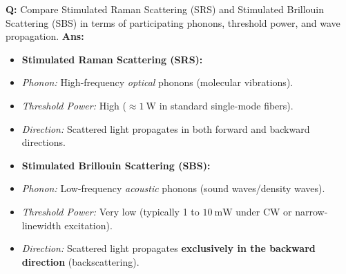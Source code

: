 \documentclass[10pt,a4paper,twocolumn]{article}
\begin{document}
\begin{tcolorbox}[
  colback=white,
  colframe=UnitColorSix,
  colbacktitle=gray!10!white,
  coltitle=black,
  fonttitle=\bfseries\sffamily\small,
  title={Unit VI $\bullet$ Card 6: SRS vs. SBS},
  boxrule=1.2pt,
  arc=2mm,
  outer arc=2mm,
  boxsep=1.5mm,
  top=1mm,
  bottom=1mm,
  left=1.5mm,
  right=1.5mm,
  before skip=2.5mm,
  after skip=2.5mm
]
\textbf{Q:} Compare Stimulated Raman Scattering (SRS) and Stimulated Brillouin Scattering (SBS) in terms of participating phonons, threshold power, and wave propagation.
\tcbline
\textbf{Ans:} \begin{itemize}
  \item   \textbf{Stimulated Raman Scattering (SRS):}
  \item   \textit{Phonon:} High-frequency \textit{optical} phonons (molecular vibrations).
  \item   \textit{Threshold Power:} High ($\approx 1\ \text{W}$ in standard single-mode fibers).
  \item   \textit{Direction:} Scattered light propagates in both forward and backward directions.
  \item   \textbf{Stimulated Brillouin Scattering (SBS):}
  \item   \textit{Phonon:} Low-frequency \textit{acoustic} phonons (sound waves/density waves).
  \item   \textit{Threshold Power:} Very low (typically 1 to $10\ \text{mW}$ under CW or narrow-linewidth excitation).
  \item   \textit{Direction:} Scattered light propagates \textbf{exclusively in the backward direction} (backscattering).
\end{itemize}
\end{tcolorbox}
\end{document}
